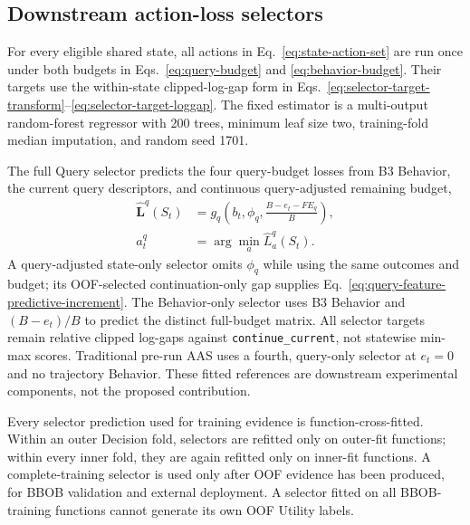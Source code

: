 \subsection{Downstream action-loss selectors}

For every eligible shared state, all actions in Eq.~\eqref{eq:state-action-set}
are run once under both budgets in Eqs.~\eqref{eq:query-budget} and
\eqref{eq:behavior-budget}.  Their targets use the within-state clipped-log-gap
form in Eqs.~\eqref{eq:selector-target-transform}--\eqref{eq:selector-target-loggap}.
The fixed estimator is a multi-output random-forest regressor with 200 trees,
minimum leaf size two, training-fold median imputation, and random seed 1701.

The full Query selector predicts the four query-budget losses from B3 Behavior,
the current query descriptors, and continuous query-adjusted remaining budget,
\begin{align}
  \widehat{\boldsymbol L}^{q}(S_t)
  &=g_q\!\left(b_t,\phi_q,\frac{B-e_t-FE_q}{B}\right),\\
  \widehat a_t^q&=\arg\min_a\widehat L_a^q(S_t).
  \label{eq:statewise-selector}
\end{align}
A query-adjusted state-only selector omits $\phi_q$ while using the same
outcomes and budget; its OOF-selected continuation-only gap supplies
Eq.~\eqref{eq:query-feature-predictive-increment}.  The Behavior-only selector
uses B3 Behavior and $(B-e_t)/B$ to predict the distinct full-budget matrix.
All selector targets remain relative clipped log-gaps against
\texttt{continue\_current}, not statewise min-max scores.
Traditional pre-run AAS uses a fourth, query-only selector at $e_t=0$ and no
trajectory Behavior.  These fitted references are downstream experimental
components, not the proposed contribution.

Every selector prediction used for training evidence is function-cross-fitted.
Within an outer Decision fold, selectors are refitted only on outer-fit
functions; within every inner fold, they are again refitted only on inner-fit
functions.  A complete-training selector is used only after OOF evidence has
been produced, for BBOB validation and external deployment.  A selector fitted
on all BBOB-training functions cannot generate its own OOF Utility labels.

